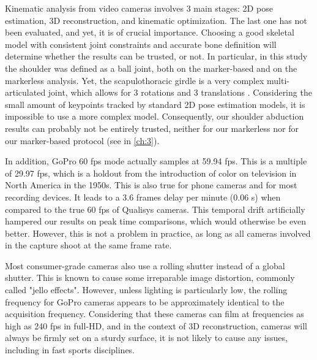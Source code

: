 Kinematic analysis from video cameras involves 3 main stages: 2D pose estimation, 3D reconstruction, and kinematic optimization. The last one has not been evaluated, and yet, it is of crucial importance. Choosing a good skeletal model with consistent joint constraints and accurate bone definition will determine whether the results can be trusted, or not. In particular, in this study the shoulder was defined as a ball joint, both on the marker-based and on the markerless analysis. Yet, the scapulothoracic girdle is a very complex multi-articulated joint, which allows for 3 rotations and 3 translations \cite{Seth2016}. Considering the small amount of keypoints tracked by standard 2D pose estimation models, it is impossible to use a more complex model. Consequently, our shoulder abduction results can probably not be entirely trusted, neither for our markerless nor for our marker-based protocol (see  in \autoref{ch:3}).

In addition, GoPro 60 fps mode actually samples at 59.94 fps. This is a multiple of 29.97 fps, which is a holdout from the introduction of color on television in North America in the 1950s. This is also true for phone cameras and for most recording devices. It leads to a 3.6 frames delay per minute (0.06 s) when compared to the true 60 fps of Qualisys cameras. This temporal drift artificially hampered our results on peak time comparisons, which would otherwise be even better. However, this is not a problem in practice, as long as all cameras involved in the capture shoot at the same frame rate.

Most consumer-grade cameras also use a rolling shutter instead of a global shutter. This is known to cause some irreparable image distortion, commonly called "jello effects". However, unless lighting is particularly low, the rolling frequency for GoPro cameras appears to be approximately identical to the acquisition frequency. Considering that these cameras can film at frequencies as high as 240 fps in full-HD, and in the context of 3D reconstruction, cameras will always be firmly set on a sturdy surface, it is not likely to cause any issues, including in fast sports disciplines.

